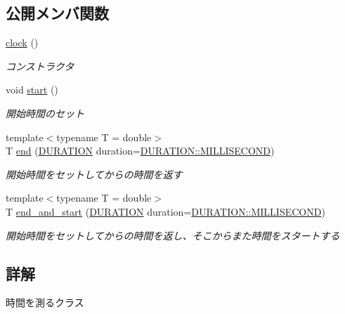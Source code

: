 \subsection*{公開メンバ関数}
\begin{DoxyCompactItemize}
\item 
\mbox{\hyperlink{classsaki_1_1clock_aec6aa6ad43fcc8f992f7ee9a25e25354}{clock}} ()
\begin{DoxyCompactList}\small\item\em コンストラクタ \end{DoxyCompactList}\item 
void \mbox{\hyperlink{classsaki_1_1clock_ad8c77a4865ba0a3840c640014887a0e3}{start}} ()
\begin{DoxyCompactList}\small\item\em 開始時間のセット \end{DoxyCompactList}\item 
{\footnotesize template$<$typename T  = double$>$ }\\T \mbox{\hyperlink{classsaki_1_1clock_a0ef6cf0641f5a3c0649574afd70def14}{end}} (\mbox{\hyperlink{classsaki_1_1clock_a33900ca0b3320bafb061928ad6827bdf}{D\+U\+R\+A\+T\+I\+ON}} duration=\mbox{\hyperlink{classsaki_1_1clock_a33900ca0b3320bafb061928ad6827bdfa241d7907de05ad50c011812e927cd671}{D\+U\+R\+A\+T\+I\+O\+N\+::\+M\+I\+L\+L\+I\+S\+E\+C\+O\+ND}})
\begin{DoxyCompactList}\small\item\em 開始時間をセットしてからの時間を返す \end{DoxyCompactList}\item 
{\footnotesize template$<$typename T  = double$>$ }\\T \mbox{\hyperlink{classsaki_1_1clock_acef0a0c3d42f803192a815a4b8f6f391}{end\+\_\+and\+\_\+start}} (\mbox{\hyperlink{classsaki_1_1clock_a33900ca0b3320bafb061928ad6827bdf}{D\+U\+R\+A\+T\+I\+ON}} duration=\mbox{\hyperlink{classsaki_1_1clock_a33900ca0b3320bafb061928ad6827bdfa241d7907de05ad50c011812e927cd671}{D\+U\+R\+A\+T\+I\+O\+N\+::\+M\+I\+L\+L\+I\+S\+E\+C\+O\+ND}})
\begin{DoxyCompactList}\small\item\em 開始時間をセットしてからの時間を返し、そこからまた時間をスタートする \end{DoxyCompactList}\end{DoxyCompactItemize}


\subsection{詳解}
時間を測るクラス 

